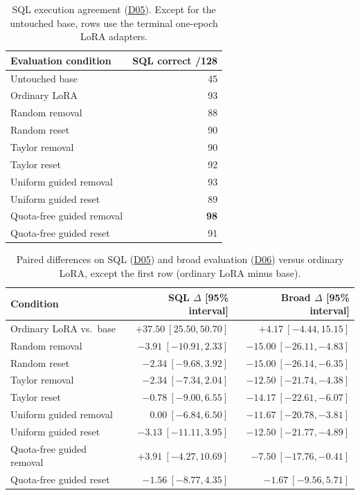 \documentclass[10pt,letterpaper]{article}
\DeclareRobustCommand{\dataset}[1]{\hyperlink{dataset-#1}{\textnormal{#1}}}
\begin{document}
\begin{table}[htbp]
\centering
\small
\caption{SQL execution agreement (\dataset{D05}).
Except for the untouched base, rows use the terminal one-epoch LoRA
adapters.}
\label{tab:outcomes}
\begin{tabular}{@{}lr@{}}
\toprule
Evaluation condition & SQL correct /128\\
\midrule
Untouched base & 45\\
Ordinary LoRA & 93\\
Random removal & 88\\
Random reset & 90\\
Taylor removal & 90\\
Taylor reset & 92\\
Uniform guided removal & 93\\
Uniform guided reset & 89\\
Quota-free guided removal & \textbf{98}\\
Quota-free guided reset & 91\\
\bottomrule
\end{tabular}
\end{table}

\begin{table}[htbp]
\centering
\small
\caption{Paired differences on SQL (\dataset{D05}) and broad evaluation
(\dataset{D06}) versus ordinary LoRA, except the first row
(ordinary LoRA minus base).}
\label{tab:paired-uncertainty}
\begin{tabular}{@{}lrr@{}}
\toprule
Condition & SQL $\Delta$ [95\% interval] & Broad $\Delta$ [95\% interval]\\
\midrule
Ordinary LoRA vs.\ base & $+37.50\ [25.50,50.70]$ & $+4.17\ [-4.44,15.15]$\\
\midrule
Random removal & $-3.91\ [-10.91,2.33]$ & $-15.00\ [-26.11,-4.83]$\\
Random reset & $-2.34\ [-9.68,3.92]$ & $-15.00\ [-26.14,-6.35]$\\
Taylor removal & $-2.34\ [-7.34,2.04]$ & $-12.50\ [-21.74,-4.38]$\\
Taylor reset & $-0.78\ [-9.00,6.55]$ & $-14.17\ [-22.61,-6.07]$\\
Uniform guided removal & $0.00\ [-6.84,6.50]$ & $-11.67\ [-20.78,-3.81]$\\
Uniform guided reset & $-3.13\ [-11.11,3.95]$ & $-12.50\ [-21.77,-4.89]$\\
Quota-free guided removal & $+3.91\ [-4.27,10.69]$ & $-7.50\ [-17.76,-0.41]$\\
Quota-free guided reset & $-1.56\ [-8.77,4.35]$ & $-1.67\ [-9.56,5.71]$\\
\bottomrule
\end{tabular}
\end{table}
\end{document}
